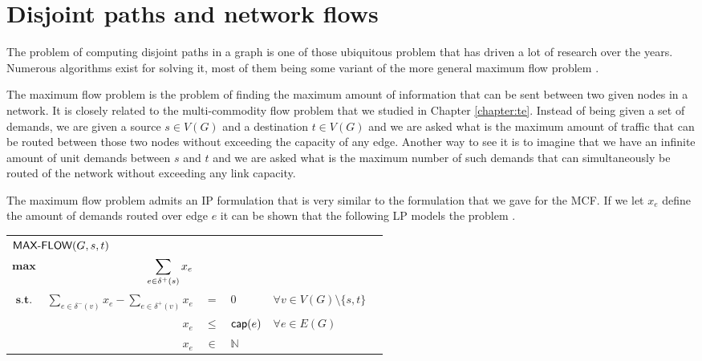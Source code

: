 \section{Disjoint paths and network flows}
\label{section:dp}

The problem of computing disjoint paths in a graph is one of those ubiquitous problem that has driven
a lot of research over the years. Numerous algorithms exist for solving it, most of them being some variant
of the more general maximum flow problem \cite{suurballe1984quick, Ahuja}.

The maximum flow problem is the problem of finding the maximum amount of information that can
be sent between two given nodes in a network. It is closely related to the multi-commodity flow
problem that we studied in Chapter \ref{chapter:te}. Instead of being given a set of demands, we are given
a source $s \in V(G)$ and a destination $t \in V(G)$ and we are asked what is the maximum amount of traffic that can be routed 
between those two nodes without exceeding the capacity of any edge. Another way to see it is to 
imagine that we have an infinite amount of unit demands between $s$ and $t$ and we are asked what is the maximum
number of such demands that can simultaneously be routed of the network without exceeding any link capacity.

The maximum flow problem admits an IP formulation that is very similar to the formulation that we gave for the MCF. If we let $x_e$
define the amount of demands routed over edge $e$ it can be shown that the following LP models the problem \cite{Ahuja}.

\begin{center}
\begin{tabular}{crcllr}
\multicolumn{5}{l}{$\textsf{MAX-FLOW}(G, s, t)$} \\[0.5cm] 
$\displaystyle \mathbf{max}$ & $\displaystyle \sum_{e \in \delta^+(s)} x_e$ & & & & \\[0.5cm]
$\textbf{s.t.}$ & $\displaystyle \sum_{e \in \delta^-(v)} x_{e} - \sum_{e \in \delta^+(v)} x_{e}$ & $=$    & $ 0$ & $\forall v \in V(G) \setminus \{ s, t \}$  &  \\[0.5cm]
                & $x_{e}$ & $\leq$ & $\mathsf{cap}(e)$ & $\forall e \in E(G)$ & \\[0.5cm]
                & $x_{e}$ & $\in$ & $\mathbb{N}$
\end{tabular}
\end{center}

